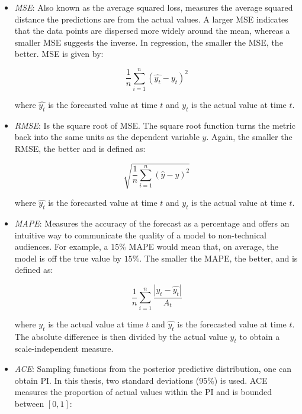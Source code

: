 \begin{itemize}
    \item \textit{MSE}: Also known as the average squared loss, measures the average squared distance the predictions are from the actual values. A larger MSE indicates that the data points are dispersed more widely around the mean, whereas a smaller MSE suggests the inverse. In regression, the smaller the MSE, the better. MSE is given by:
    
    \begin{equation}
        \frac{1}{n}\sum_{i=1}^n(\hat{y_t} - y_t)^2
    \end{equation}
    
    where $\hat{y_t}$ is the forecasted value at time $t$ and $y_t$ is the actual value at time $t$. 
    
    \item \textit{RMSE}: Is the square root of MSE. The square root function turns the metric back into the same units as the dependent variable $y$. Again, the smaller the RMSE, the better and is defined as:
    
    \begin{equation}
        \sqrt{\frac{1}{n}\sum_{i=1}^n(\hat{y} - y)^2}
    \end{equation}
    
    where $\hat{y_t}$ is the forecasted value at time $t$ and $y_t$ is the actual value at time $t$. 
    
    \item \textit{MAPE}: Measures the accuracy of the forecast as a percentage and offers an intuitive way to communicate the quality of a model to non-technical audiences. For example,  a $15\%$ MAPE would mean that, on average, the model is off the true value by $15\%$. The smaller the MAPE, the better, and is defined as:
    
    \begin{equation}
        \frac{1}{n}\sum_{i=1}^n \frac{|y_t - \hat{y_t}|}{A_t}
    \end{equation}
    
    where $y_t$ is the actual value at time $t$ and $\hat{y_t}$ is the forecasted value at time $t$. The absolute difference is then divided by the actual value $y_t$ to obtain a scale-independent measure. 
    
    \item \textit{ACE}: Sampling functions from the posterior predictive distribution, one can obtain \ac{PI}. In this thesis, two standard deviations (95\%) is used. ACE measures the proportion of actual values within the PI and is bounded between $[0, 1]$:
    

\end{itemize}
